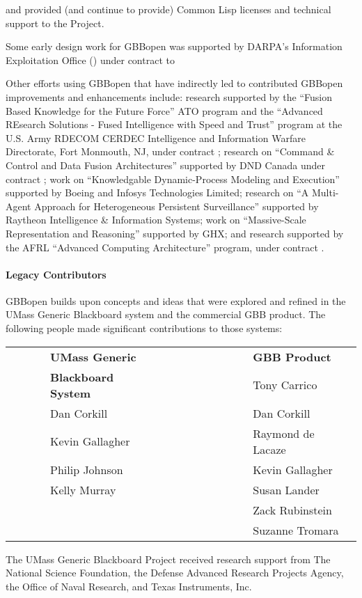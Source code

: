 and  provided (and continue to provide)
Common Lisp licenses and technical support to the Project.

Some early design work for GBBopen was supported by DARPA's Information
Exploitation Office () under
contract  to 

Other efforts using GBBopen that have indirectly led to contributed GBBopen
improvements and enhancements include: research supported by the ``Fusion
Based Knowledge for the Future Force'' ATO program and the ``Advanced REsearch
Solutions - Fused Intelligence with Speed and Trust'' program at the U.S. Army
RDECOM CERDEC Intelligence and Information Warfare Directorate, Fort Monmouth,
NJ, under contract ; research on ``Command \& Control
and Data Fusion Architectures'' supported by DND Canada under contract
; work on ``Knowledgable Dynamic-Process Modeling and
Execution'' supported by Boeing and Infosys Technologies Limited; research on
``A Multi-Agent Approach for Heterogeneous Persistent Surveillance'' supported
by Raytheon Intelligence \& Information Systems; work on ``Massive-Scale
Representation and Reasoning'' supported by GHX; and research supported by the
AFRL ``Advanced Computing Architecture'' program, under contract
.

\paragraph{Legacy Contributors}

GBBopen builds upon concepts and ideas that were explored and refined in the
UMass Generic Blackboard system and the commercial GBB product.  The following
people made significant contributions to those systems:

\begin{tabular}{llll}
  ~~~~~& \textbf{UMass Generic} & ~~~~~~~~~~~~~ & \textbf{GBB Product}\\
  & \textbf{Blackboard System} & & Tony Carrico \\  
  & Dan Corkill & & Dan Corkill \\
  & Kevin Gallagher & & Raymond de Lacaze\\
  & Philip Johnson & & Kevin Gallagher\\
  & Kelly Murray & & Susan Lander \\
  & & & Zack Rubinstein\\
  & & & Suzanne Tromara\\
\end{tabular}

The UMass Generic Blackboard Project received research support from The
National Science Foundation, the Defense Advanced Research Projects Agency,
the Office of Naval Research, and Texas Instruments, Inc.

